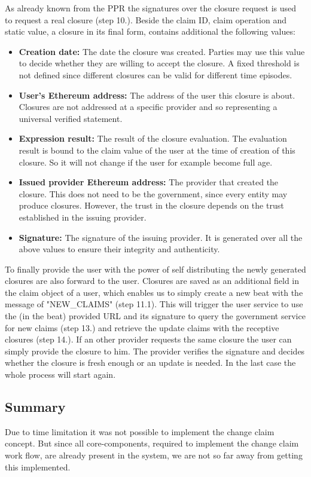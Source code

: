 As already known from the PPR the signatures over the closure request is used to request a real closure (step 10.). Beside the claim ID, claim operation and static value, a closure in its final form, contains additional the following values:

\begin{itemize}
\item \textbf{Creation date:} The date the closure was created. Parties may use this value to decide whether they are willing to accept the closure. A fixed threshold is not defined since different closures can be valid for different time episodes. 
\item \textbf{User’s Ethereum address:} The address of the user this closure is about. Closures are not addressed at a specific provider and so representing a universal verified statement.
\item \textbf{Expression result:} The result of the closure evaluation. The evaluation result is bound to the claim value of the user at the time of creation of this closure. So it will not change if the user for example become full age. 
\item \textbf{Issued provider Ethereum address:} The provider that created the closure. This does not need to be the government, since every entity may produce closures. However, the trust in the closure depends on the trust established in the issuing provider.
\item \textbf{Signature:} The signature of the issuing provider. It is generated over all the above values to ensure their integrity and authenticity. 
\end{itemize} 

To finally provide the user with the power of self distributing the newly generated closures are also forward to the user. Closures are saved as an additional field in the claim object of a user, which enables us to simply create a new beat with the message of "NEW\_CLAIMS" (step 11.1). This will trigger the user service to use the (in the beat) provided URL and its signature to query the government service for new claims (step 13.) and retrieve the update claims with the receptive closures (step 14.). If an other provider requests the same closure the user can simply provide the closure to him. The provider verifies the signature and decides whether the closure is fresh enough or an update is needed. In the last case the whole process will start again. 

\subsection{Summary}
\label{sec:coreSummary}
Due to time limitation it was not possible to implement the change claim concept. But since all core-components, required to implement the change claim work flow, are already present in the system, we are not so far away from getting this implemented.

